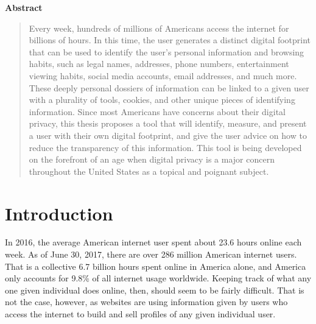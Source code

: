 \documentclass[11pt]{article}
\begin{document}
\begin{center}
\large\bf Abstract
\vspace{-1em}  %
\end{center}


\begin{quote}
Every week, hundreds of millions of Americans access the internet for billions of hours. In this time, the user generates a distinct digital footprint that can be used to identify the user's personal information and browsing habits, such as legal names, addresses, phone numbers, entertainment viewing habits, social media accounts, email addresses, and much more. These deeply personal dossiers of information can be linked to a given user with a plurality of tools, cookies, and other unique pieces of identifying information. Since most Americans have concerns about their digital privacy, this thesis proposes a tool that will identify, measure, and present a user with their own digital footprint, and give the user advice on how to reduce the transparency of this information. This tool is being developed on the forefront of an age when digital privacy is a major concern throughout the United States as a topical and poignant subject.
\end{quote}

\section{Introduction}
\label{sec:introduction}
\vspace*{-.1in}


In 2016, the average American internet user spent about 23.6 hours online each week\cite{digital-future}. As of June 30, 2017, there are over 286 million American internet users. That is a collective 6.7 billion hours spent online in America alone, and America only accounts for 9.8\% of all internet usage worldwide\cite{internet-world-stats}. Keeping track of what any one given individual does online, then, should seem to be fairly difficult. That is not the case, however, as websites are using information given by users who access the internet to build and sell profiles of any given individual user. 
\end{document}
